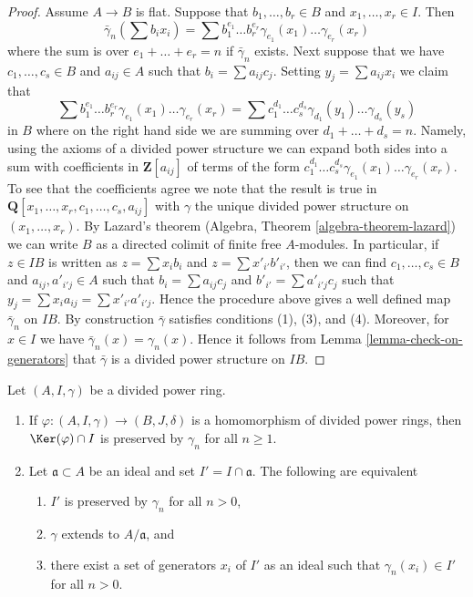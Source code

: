 \begin{proof}
\medskip\noindent
Assume $A \to B$ is flat. Suppose that $b_1, \ldots, b_r \in B$ and
$x_1, \ldots, x_r \in I$. Then
$$
\bar\gamma_n(\sum b_ix_i) =
\sum b_1^{e_1} \ldots b_r^{e_r} \gamma_{e_1}(x_1) \ldots \gamma_{e_r}(x_r)
$$
where the sum is over $e_1 + \ldots + e_r = n$
if $\bar\gamma_n$ exists. Next suppose that we have $c_1, \ldots, c_s \in B$
and $a_{ij} \in A$ such that $b_i = \sum a_{ij}c_j$.
Setting $y_j = \sum a_{ij}x_i$ we claim that
$$
\sum b_1^{e_1} \ldots b_r^{e_r} \gamma_{e_1}(x_1) \ldots \gamma_{e_r}(x_r) =
\sum c_1^{d_1} \ldots c_s^{d_s} \gamma_{d_1}(y_1) \ldots \gamma_{d_s}(y_s)
$$
in $B$ where on the right hand side we are summing over
$d_1 + \ldots + d_s = n$. Namely, using the axioms of a divided power
structure we can expand both sides into a sum with coefficients
in $\mathbf{Z}[a_{ij}]$ of terms of the form 
$c_1^{d_1} \ldots c_s^{d_s}\gamma_{e_1}(x_1) \ldots \gamma_{e_r}(x_r)$.
To see that the coefficients agree we note that the result is true
in $\mathbf{Q}[x_1, \ldots, x_r, c_1, \ldots, c_s, a_{ij}]$ with
$\gamma$ the unique divided power structure on $(x_1, \ldots, x_r)$.
By Lazard's theorem (Algebra, Theorem \ref{algebra-theorem-lazard})
we can write $B$ as a directed colimit of finite free $A$-modules.
In particular, if $z \in IB$ is written as $z = \sum x_ib_i$ and
$z = \sum x'_{i'}b'_{i'}$, then we can find $c_1, \ldots, c_s \in B$
and $a_{ij}, a'_{i'j} \in A$ such that $b_i = \sum a_{ij}c_j$
and $b'_{i'} = \sum a'_{i'j}c_j$ such that
$y_j = \sum x_ia_{ij} = \sum x'_{i'}a'_{i'j}$.
Hence the procedure above gives a well defined map $\bar\gamma_n$
on $IB$. By construction $\bar\gamma$ satisfies conditions (1), (3), and
(4). Moreover, for $x \in I$ we have $\bar\gamma_n(x) = \gamma_n(x)$. Hence
it follows from Lemma \ref{lemma-check-on-generators} that $\bar\gamma$
is a divided power structure on $IB$.
\end{proof}

\begin{lemma}
\label{lemma-kernel}
Let $(A, I, \gamma)$ be a divided power ring.
\begin{enumerate}
\item If $\varphi : (A, I, \gamma) \to (B, J, \delta)$ is a
homomorphism of divided power rings, then $\Ker(\varphi) \cap I$
is preserved by $\gamma_n$ for all $n \geq 1$.
\item Let $\mathfrak a \subset A$ be an ideal and set
$I' = I \cap \mathfrak a$. The following are equivalent
\begin{enumerate}
\item $I'$ is preserved by $\gamma_n$ for all $n > 0$,
\item $\gamma$ extends to $A/\mathfrak a$, and
\item there exist a set of generators $x_i$ of $I'$ as an ideal
such that $\gamma_n(x_i) \in I'$ for all $n > 0$.
\end{enumerate}
\end{enumerate}
\end{lemma}

